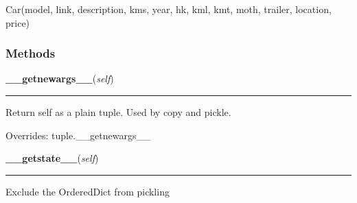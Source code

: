 Car(model, link, description, kms, year, hk, kml, kmt, moth, trailer, 
location, price)



  \subsubsection{Methods}

    \vspace{0.5ex}

\hspace{.8\funcindent}\begin{boxedminipage}{\funcwidth}

    \raggedright \textbf{\_\_getnewargs\_\_}(\textit{self})

    \vspace{-1.5ex}

    \rule{\textwidth}{0.5\fboxrule}
\setlength{\parskip}{2ex}
    Return self as a plain tuple.  Used by copy and pickle.

\setlength{\parskip}{1ex}
      Overrides: tuple.\_\_getnewargs\_\_

    \end{boxedminipage}

    \label{BilbasenDataMining:bilbasen:Car:__getstate__}

    \vspace{0.5ex}

\hspace{.8\funcindent}\begin{boxedminipage}{\funcwidth}

    \raggedright \textbf{\_\_getstate\_\_}(\textit{self})

    \vspace{-1.5ex}

    \rule{\textwidth}{0.5\fboxrule}
\setlength{\parskip}{2ex}
    Exclude the OrderedDict from pickling

\setlength{\parskip}{1ex}
    \end{boxedminipage}

    \vspace{0.5ex}

